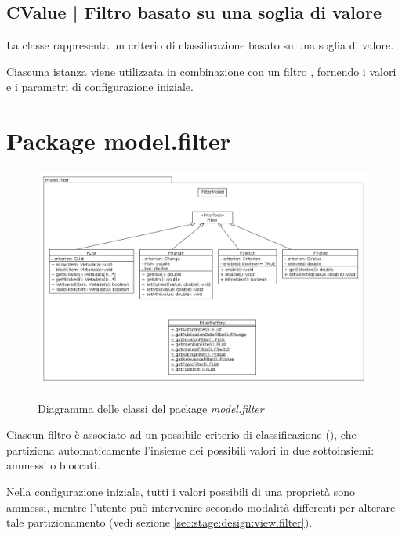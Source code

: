 \documentclass[10pt,a4paper,headinclude,footinclude,hidelinks]{scrreprt} %
\begin{document}
	\subsection[CValue]{CValue | Filtro basato su una soglia di valore}
	\label{sec:stage:design:model.criteria:value-criterion}
	La classe \textit{} rappresenta un criterio di classificazione basato su una soglia di valore.

	Ciascuna istanza viene utilizzata in combinazione con un filtro \textit{}, fornendo i valori e i parametri di configurazione iniziale.

	\section{Package model.filter}
	\label{sec:stage:design:model.filter}

	\begin{figure}[ht]
		\begin{center}
	    	\includegraphics[width=12cm]{class/model_filter.png}
			\label{gfx:class:model:filter}
			\caption{Diagramma delle classi del package \textit{model.filter}}
		\end{center}
	\end{figure}

	Ciascun filtro è associato ad un possibile criterio di classificazione (\textit{}), che partiziona automaticamente l'insieme dei possibili valori in due sottoinsiemi: ammessi o bloccati.

	Nella configurazione iniziale, tutti i valori possibili di una proprietà sono ammessi, mentre l'utente può intervenire secondo modalità differenti per alterare tale partizionamento (vedi sezione \ref{sec:stage:design:view.filter}).
	
\end{document}
